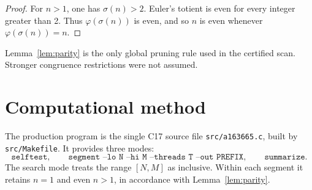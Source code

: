 \documentclass[11pt]{article}
\theoremstyle{definition}
\theoremstyle{remark}
\begin{document}
\begin{proof}
For \(n>1\), one has \(\sigma(n)>2\).  Euler's totient is even for every
integer greater than 2.  Thus \(\varphi(\sigma(n))\) is even, and so \(n\) is
even whenever \(\varphi(\sigma(n))=n\).
\end{proof}

Lemma~\ref{lem:parity} is the only global pruning rule used in the
certified scan.  Stronger congruence restrictions were not assumed.

\section{Computational method}

The production program is the single C17 source file
\texttt{src/a163665.c}, built by \texttt{src/Makefile}.  It provides
three modes:
\[
\texttt{selftest},\qquad
\texttt{segment --lo N --hi M --threads T --out PREFIX},\qquad
\texttt{summarize}.
\]
The search mode treats the range \([N,M]\) as inclusive.  Within each
segment it retains \(n=1\) and even \(n>1\), in accordance with
Lemma~\ref{lem:parity}.
\end{document}
